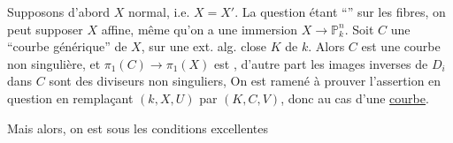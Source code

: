 Supposons d'abord $X$ normal, i.e. $X=X'$.  La question étant  ``'' sur les fibres, on peut supposer $X$ affine, même qu'on a une immersion $X\longrightarrow\mathbb P^n_k$. 
 Soit $C$ une ``courbe générique'' de $X$,    sur une ext. alg. close $K$ de $k$. Alors
$C$ est une courbe non singulière, et $\pi_1(C)\to\pi_1(X)$ est , d'autre part les images inverses de $D_i$ dans $C$ sont des diviseurs non singuliers,  
\margin{\rule{4em}{.4pt}}
On est ramené à prouver l'assertion en question en remplaçant $(k,X,U)$ par $(K,C,V)$, donc au cas d'une \uline{courbe}.

Mais alors, on est sous les conditions excellentes
